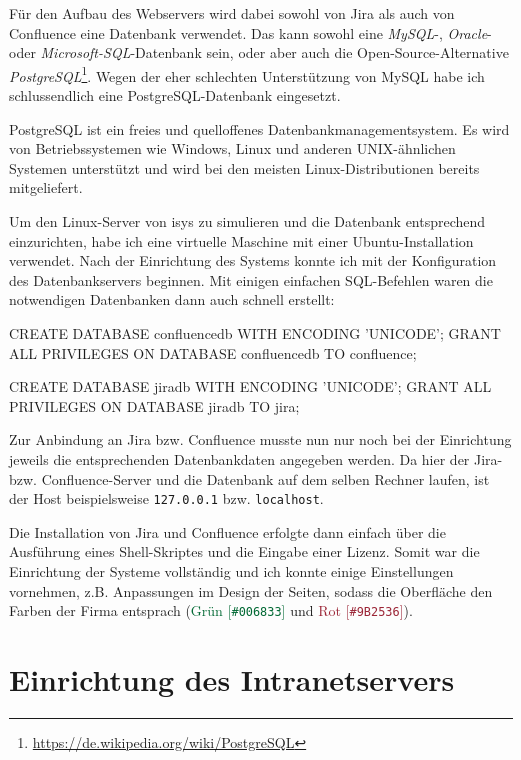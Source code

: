 Für den Aufbau des Webservers wird dabei sowohl von Jira als auch von Confluence
eine Datenbank verwendet. Das kann sowohl eine \textit{MySQL}-, \textit{Oracle}-
oder \textit{Microsoft-SQL}-Datenbank sein, oder aber auch die Open-Source-Alternative
\textit{PostgreSQL}\footnote{\url{https://de.wikipedia.org/wiki/PostgreSQL}}. Wegen der eher schlechten Unterstützung von MySQL habe ich
schlussendlich eine PostgreSQL-Datenbank eingesetzt.

PostgreSQL ist ein freies und quelloffenes Datenbankmanagementsystem. Es wird von
Betriebssystemen wie Windows, Linux und anderen UNIX-ähnlichen Systemen unterstützt
und wird bei den meisten Linux-Distributionen bereits mitgeliefert.

Um den Linux-Server von isys zu simulieren und die Datenbank entsprechend einzurichten,
habe ich eine virtuelle Maschine mit einer Ubuntu-Installation verwendet. Nach der
Einrichtung des Systems konnte ich mit der Konfiguration des Datenbankservers beginnen.
Mit einigen einfachen SQL-Befehlen waren die notwendigen Datenbanken dann auch schnell
erstellt:

\begin{code}[language=SQL, caption={SQL-Befehle zur Erstellung der Datenbanken}, label={lst:jira-database}]
CREATE DATABASE confluencedb WITH ENCODING 'UNICODE';
GRANT ALL PRIVILEGES ON DATABASE confluencedb TO confluence;

CREATE DATABASE jiradb WITH ENCODING 'UNICODE';
GRANT ALL PRIVILEGES ON DATABASE jiradb TO jira;
\end{code}

Zur Anbindung an Jira bzw. Confluence musste nun nur noch bei der Einrichtung jeweils
die entsprechenden Datenbankdaten angegeben werden. Da hier der Jira- bzw. Confluence-Server
und die Datenbank auf dem selben Rechner laufen, ist der Host beispielsweise \texttt{127.0.0.1}
bzw. \texttt{localhost}.

Die Installation von Jira und Confluence erfolgte dann einfach über die Ausführung
eines Shell-Skriptes und die Eingabe einer Lizenz. Somit war die Einrichtung der
Systeme vollständig und ich konnte einige Einstellungen vornehmen, z.B. Anpassungen
im Design der Seiten, sodass die Oberfläche den Farben der Firma entsprach
(\textcolor[HTML]{006833}{Grün [\texttt{\#006833}]} und \textcolor[HTML]{9B2536}{Rot [\texttt{\#9B2536}]}).



\section{Einrichtung des Intranetservers}
\label{sec:jira-server}

